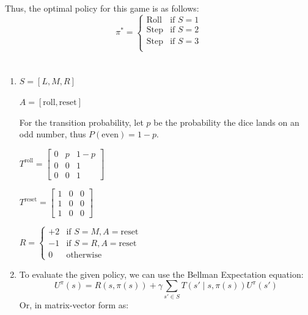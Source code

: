 \documentclass[11pt]{article}
\begin{document}
\begin{enumerate}[label=\alph*)]
    Thus, the optimal policy for this game is as follows:
    \[
        \pi^* = \begin{cases}
        \mathrm{Roll} & \text{if } S = 1 \\
        \mathrm{Step} & \text{if } S = 2 \\
        \mathrm{Step} & \text{if } S = 3 \\
        \end{cases}
    \]


\end{enumerate}

\section{}

\begin{enumerate}[label=\alph*)]
    \item 
    \( S = [L,M,R]\)

    \(A = [\mathrm{roll}, \mathrm{reset}]\) \newline

    For the transition probability, let $p$ be the probability
    the dice lands on an odd number, thus $P(\mathrm{even}) = 1-p$.  

    \( T^{\mathrm{roll}} = 
        \begin{bmatrix}
            0 & p & 1-p  \\
            0 & 0 & 1  \\
            0 & 0 & 1  
        \end{bmatrix}
    \)

    \(
        T^{\mathrm{reset}} = 
        \begin{bmatrix}
            1 & 0 & 0 \\
            1 & 0 & 0 \\
            1 & 0 & 0 
        \end{bmatrix}
    \) \newline

    \(
        R = \begin{cases}
        +2 & \text{if } S = M, A = \mathrm{reset} \\
        -1 & \text{if } S = R, A = \mathrm{reset} \\
        0 & \mathrm{otherwise}
        \end{cases}
    \)
    \item
    
    To evaluate the given policy, we can use the Bellman Expectation equation:
    \[U^{\pi}(s) = R(s,\pi(s)) + \gamma \sum_{s' \in S} T(s' \mid s, \pi(s))U^{\pi}(s')\]
    Or, in matrix-vector form as:
    

\end{enumerate}
\end{document}
